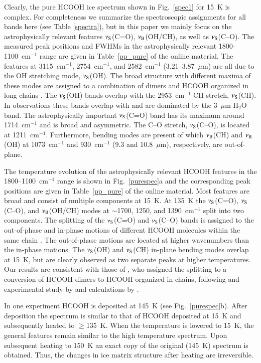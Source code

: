 \documentclass{aa}
\begin{document}
Clearly, the pure HCOOH ice spectrum shown in Fig.~\ref{spec1} for
15~K is complex. For completeness we summarize the spectroscopic
assignments for all bands here (see Table \ref{spectra}), but in this
paper we mainly focus on the astrophysically relevant features
$\nu_{\rm S}$(C=O), $\nu_{\rm B}$(OH/CH), as well as $\nu_{\rm
  S}$(C--O). The measured peak positions and FWHMs in the
astrophysically relevant 1800-1100~cm$^{-1}$ range are given in
Table~\ref{pp_pure} of the online material. The features at
3115~cm$^{-1}$, 2754~cm$^{-1}$, and 2582~cm$^{-1}$ (3.21--3.87~$\mu$m)
are all due to the OH stretching mode, $\nu_{\rm S}$(OH). The broad
structure with different maxima of these modes are assigned to a
combination of dimers and HCOOH organized in long chains
\citep{cyriac2005}. The $\nu_{\rm S}$(OH) bands overlap with the
2953~cm$^{-1}$ CH stretch, $\nu_{\rm S}$(CH). In observations these
bands overlap with and are dominated by the 3~$\mu$m H$_2$O band. The
astrophysically important $\nu_{\rm S}$(C=O) band has its maximum
around 1714~cm$^{-1}$ and is broad and asymmetric. The C--O stretch,
$\nu_{\rm S}$(C--O), is located at 1211~cm$^{-1}$. Furthermore,
bending modes are present of which $\nu_{\rm B}$(CH) and $\nu_{\rm
  B}$(OH) at 1073~cm$^{-1}$ and 930~cm$^{-1}$ (9.3 and 10.8~$\mu$m),
respectively, are out-of-plane.

The temperature evolution of the astrophysically relevant HCOOH
features in the 1800--1100~cm$^{-1}$ range is shown in
Fig.~\ref{purespec}a and the corresponding peak positions are given in
Table~\ref{pp_pure} of the online material. Most features are broad
and consist of multiple components at 15~K. At 135~K the $\nu_{\rm
  S}$(C=O), $\nu_{\rm S}$(C--O), and $\nu_{\rm B}$(OH/CH) modes at
$\sim$1700, 1250, and 1390~cm$^{-1}$ split into two components. The
splitting of the $\nu_{\rm S}$(C=O) and $\nu_{\rm S}$(C--O) bands is
assigned to the out-of-phase and in-phase motions of different HCOOH
molecules within the same chain \citep{cyriac2005}. The out-of-phase
motions are located at higher wavenumbers than the in-phase
motions. The $\nu_{\rm S}$(OH) and $\nu_{\rm S}$(CH) in-plane bending
modes overlap at 15~K, but are clearly observed as two separate peaks
at higher temperatures. Our results are consistent with those of
\citet{cyriac2005}, who assigned the splitting to a conversion of
HCOOH dimers to HCOOH organized in chains, following and experimental
study by \citet{millikan1958} and calculations by
\citet{yokoyama1991}.

In one experiment HCOOH is deposited at 145~K (see
Fig.~\ref{purespec}b). After deposition the spectrum is similar to
that of HCOOH deposited at 15~K and subsequently heated to
$\geq$135~K. When the temperature is lowered to 15~K, the general
features remain similar to the high temperature spectrum. Upon
subsequent heating to 150~K an exact copy of the original (145~K)
spectrum is obtained. Thus, the changes in ice matrix structure after
heating are irreversible.
\end{document}
